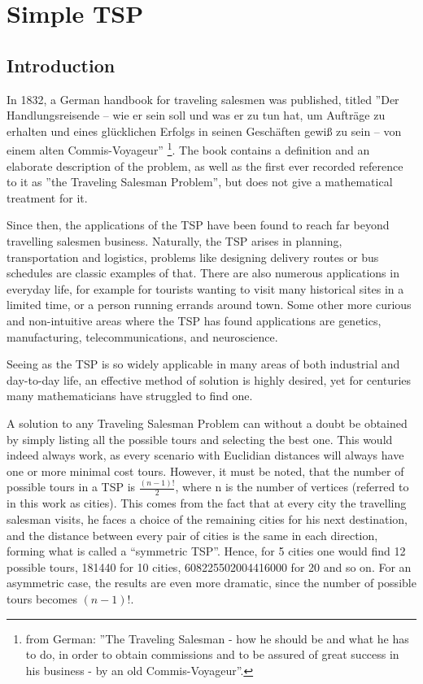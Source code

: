 \chapter{Simple TSP}
\section{Introduction}


\par
In 1832, a German handbook for traveling salesmen was published, titled ''Der Handlungsreisende – wie er sein soll und was er zu tun hat, um Aufträge zu erhalten und eines glücklichen Erfolgs in seinen Geschäften gewiß zu sein – von einem alten Commis-Voyageur'' \footnote{%
	from German: ''The Traveling Salesman - how he should be and what he has to do, in order to obtain commissions and to be assured of great success in his business - by an old Commis-Voyageur''.}. 
 The book contains a definition and an elaborate description of the problem, as well as the first ever recorded reference to it as ''the Traveling Salesman Problem'', but does not give a mathematical treatment for it. 
 
\vspace{5mm}
Since then, the applications of the TSP have been found to reach far beyond travelling salesmen business. Naturally, the TSP arises in planning, transportation and logistics, problems like designing delivery routes or bus schedules are classic examples of that. There are also numerous applications in everyday life, for example for tourists wanting to visit many historical sites in a limited time, or a person running errands around town. Some other more curious and non-intuitive areas where the TSP has found applications are genetics, manufacturing, telecommunications, and neuroscience.

\vspace{5mm}
Seeing as the TSP is so widely applicable in many areas of both industrial and day-to-day life, an effective method of solution is highly desired, yet for centuries many mathematicians have struggled to find one.

\vspace{5mm}
A solution to any Traveling Salesman Problem can without a doubt be obtained by simply listing all the possible tours and selecting the best one. This would indeed always work, as every scenario with Euclidian distances will always have one or more minimal cost tours. However, it must be noted, that the number of possible tours in a TSP is $\frac{(n-1)!}{2}$, where n is the number of vertices (referred to in this work as cities). This comes from the fact that at every city the travelling salesman visits, he faces a choice of the remaining cities for his next destination, and the distance between every pair of cities is the same in each direction, forming what is called a “symmetric TSP”. Hence, for 5 cities one would find 12 possible tours, 181440 for 10 cities, 608225502004416000 for 20 and so on. For an asymmetric case, the results are even more dramatic, since the number of possible tours becomes $(n-1)!$.


